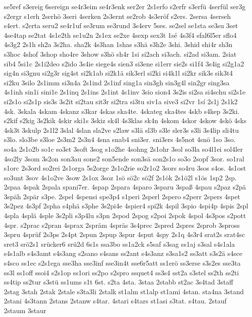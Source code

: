 {se5ref
s3ereig
6sereign
se4r3eim
se4r3enk
ser2er
2s1erfo
s2erfr
s3erfü
4serfül
ser3g
s2ergr
s1erh
2serhö
3seri
4serken
2s3ernt
se2rob
4s3eröf
s2ers.
2sersa
4serseh
s4ert.
s2erta
seru2
se4r1uf
se3rum
se3rund
3s4erv
5ses.
se2sel
se1sta
se3su
3set
4se4tap
se2tat
4s1e2th
se1u2n
2s1ex
se2xe
4sexp
sex3t
1sé
4s3f4
sfal6l5er
sflo4
4s3g2
2s1h
sh2a
3s2ha.
sha2k
4s3han
1shas
s3hä
s3h2e
3shi.
3shid
shi4r
sh3n
s3hoc
4shof
3shop
sho4re
3show
s3hö
sh4r
1si
si2ach
si3ach.
si2ad
si3am.
2siat
sib4
5si1c
2s1i2deo
s2ido
3s4ie
siege4s
sien3
si3ene
si1err
sie2s
si1f4
3s4ig
si2g1a2
sig4n
si3gnu
si2g3r
sig4st
si2k1ab
si2k1ä
sik3erl
si2ki
si4k1l
si2kr
sik3s
sik3t4
si2ku
3silo
2s1imm
si3n4a
2s1ind
2s1inf
sing1a
sin3gh
sin3g4l
sin2gr
sing3sa
4s1inh
sin1i
sini1e
2s1inq
2s1ins
2s1int
4s1inv
3sio
sion4
3s2is
si2sa
si4schu
si2s1e
si2s1o
si2s1p
sis3s
3s2it
si2tau
sit3r
si2tra
si3tu
siv1a
sive3
si2vr
1sí
2s1j
2s1k2
4sk.
3skala
4skam
4skanz
s3kar
4skas
ska4te.
4skateg
ska4tes
4skb
s4kep
3s2ki.
s2kif
s2kig
3s2kik
4skir
ski1s
3skiz
sk4l
4s3klas
sk4n
4skom
4skor
4skow
4skö
4sks
4sk3t
3skulp
2s1l2
3slal
4slan
sla2ve
s2law
s3lä
sl3b
s3le
sler3s
s3li
3s4lip
sli4tu
s3lo.
slo3be
s3loe
2s3m2
2s3n4
4sna
snab4
sni3er.
sni3ers
4s5not
4snö
1so
3so.
so4a
2s1o2b
so1c
so3et
3soft
3sog
s1o2he
4sohng
2s1ohr
3sol
so3la
so4l1ei
sol4ler
4so2ly
3som
3s2on
son3au
sone2
son5ende
son3sä
son2s1o
so3o
2sopf
3sor.
so1ral
s1orc
2s3ord
so2rei
2s1orga
5s2orge
2s1o2rie
so2r1o2
3sors
so4ru
3sos
s4os.
4s1ost
so3unt
3sov
4s1o2ve
3sow
2s1ox
3soz
1sö
sö2c
sö2f
2s1ök
2s1ö2l
s1ös
1sp2
2sp.
2spaa
4spak
2spala
spani7er.
4spap
2spara
4sparo
3sparu
3spaß
4spau
s2paz
s2pä
3späh
2spär
s3pe.
2spel
4spensi
spe3p4
s1peri
2sperl
2spero
s2perr
2spers
4spet
3s2pez
4s3pf
2spha
s4phä
s3phe
3s2pi4e
4spier4
spi2k
4spil
3spio
4spi4p
4spis
2spl
4spla
4splä
4sple
3s2pli
s3p4lu
s3pn
2spod
2spog
s2poi
2spok
4spol
4s3pos
s2pott
4spr.
s2prac
s2pran
4sprax
2spräm
4spräs
3s4prec
2spred
2spres
2sprob
3spross
3spru
4sprüf
2s3ps
2s4pt
2spun
2spup
3spur
4sput
4spy
2s1q
4s3r4
srat2s
srat4sc
sret3
srö2s1
srücker6
srü2d
6s1s
ssa3bo
ss1a2ck
s5saf
s3sag
ss1aj
s3sal
s4s1ala
s4s1alb
s4s3amt
s4s3ang
s2sano
s4sans
ss2ant
s4s3anz
s3sa1s2
ss3att
s3s2ä
s4sce
s4sco
ss1ec
s2s1ega
sse3ha
sse3inf
sse3in4t
sse6r5att
ss1erö
ss3erse
s3s2es
sse3ta
ss3l
ss1off
ssoi4
s2s1op
ss1ori
ss2po
s2spro
ssquet4
ss3s4
sst2a
s3stel
ss2th
ss2ti
ss4tip
ss2tur
s3stü
ss1ums
s1t
6st.
s2ta
4sta.
3staa
2stabb
st2ac
3s4tad
3staff
2stag
3stah
2stak
2stale
s3ta3li
2stalk
st1alm
st1alp
st1ami
4stan.
sta4na
3stand
2stani
4s3tann
2stans
2stanw
s4tar.
4stari
s4tars
st1asi
s3tat.
s4tau.
2stauf
2staum
3staur
}
